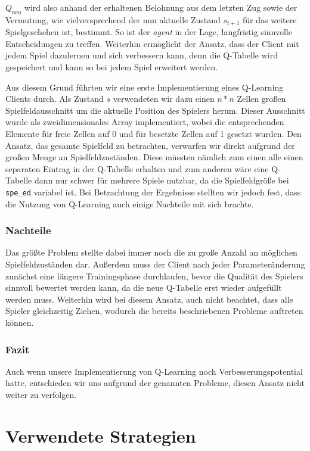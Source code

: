 \documentclass[12pt,a4paper]{article}
\begin{document}
$Q_\mathrm{neu}$ wird also anhand der erhaltenen Belohnung aus dem letzten Zug sowie der Vermutung, wie vielversprechend der nun aktuelle Zustand $s_{t+1}$ für das weitere Spielgeschehen ist, bestimmt. So ist der \textit{agent} in der Lage, langfristig sinnvolle Entscheidungen zu treffen. Weiterhin ermöglicht der Ansatz, dass der Client mit jedem Spiel dazulernen und sich verbessern kann, denn die Q-Tabelle wird gespeichert und kann so bei jedem Spiel erweitert werden.

Aus diesem Grund führten wir eine erste Implementierung eines Q-Learning Clients durch. Als Zustand $s$ verwendeten wir dazu einen $n*n$ Zellen großen Spielfeldausschnitt um die aktuelle Position des Spielers herum. Dieser Ausschnitt wurde als zweidimensionales Array implementiert, wobei die entsprechenden Elemente für freie Zellen auf 0 und für besetzte Zellen auf 1 gesetzt wurden. Den Ansatz, das gesamte Spielfeld zu betrachten, verwarfen wir direkt aufgrund der großen Menge an Spielfeldzuständen. Diese müssten nämlich zum einen alle einen separaten Eintrag in der Q-Tabelle erhalten und zum anderen wäre eine Q-Tabelle dann nur schwer für mehrere Spiele nutzbar, da die Spielfeldgröße bei \texttt{spe\_ed} variabel ist. Bei Betrachtung der Ergebnisse stellten wir jedoch fest, dass die Nutzung von Q-Learning auch einige Nachteile mit sich brachte.

\subsubsection{Nachteile}
Das größte Problem stellte dabei immer noch die zu große Anzahl an möglichen Spielfeldzuständen dar. Außerdem muss der Client nach jeder Parameteränderung zunächst eine längere Trainingsphase durchlaufen, bevor die Qualität des Spielers sinnvoll bewertet werden kann, da die neue Q-Tabelle erst wieder aufgefüllt werden muss. Weiterhin wird bei diesem Ansatz, auch nicht beachtet, dass alle Spieler gleichzeitig Ziehen, wodurch die bereits beschriebenen Probleme auftreten können.

\subsubsection{Fazit}
Auch wenn unsere Implementierung von Q-Learning noch Verbesserungspotential hatte, entschieden wir uns aufgrund der genannten Probleme, diesen Ansatz nicht weiter zu verfolgen.

\section{Verwendete Strategien}
\end{document}
